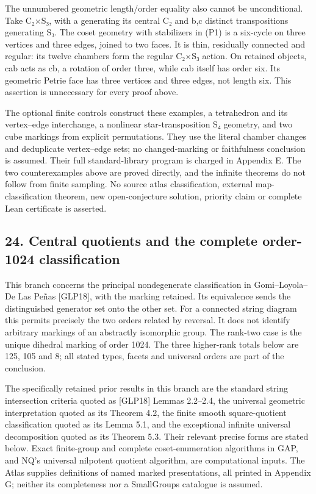 \documentclass[
  10pt,
  letterpaper,
]{article}
\begin{document}
The unnumbered geometric length/order equality also cannot be
unconditional. Take C₂×S₃, with a generating its central C₂ and b,c
distinct transpositions generating S₃. The coset geometry with
stabilizers in (P1) is a six-cycle on three vertices and three edges,
joined to two faces. It is thin, residually connected and regular: its
twelve chambers form the regular C₂×S₃ action. On retained objects, cab
acts as cb, a rotation of order three, while cab itself has order six.
Its geometric Petrie face has three vertices and three edges, not length
six. This assertion is unnecessary for every proof above.

The optional finite controls construct these examples, a tetrahedron and
its vertex--edge interchange, a nonlinear star-transposition S₄
geometry, and two cube markings from explicit permutations. They use the
literal chamber changes and deduplicate vertex--edge sets; no
changed-marking or faithfulness conclusion is assumed. Their full
standard-library program is charged in Appendix E. The two
counterexamples above are proved directly, and the infinite theorems do
not follow from finite sampling. No source atlas classification,
external map-classification theorem, new open-conjecture solution,
priority claim or complete Lean certificate is asserted.

\subsection{24. Central quotients and the complete order-1024
classification}\label{central-quotients-and-the-complete-order-1024-classification}

This branch concerns the principal nondegenerate classification in
Gomi--Loyola--De Las Peñas {[}GLP18{]}, with the marking retained. Its
equivalence sends the distinguished generator set onto the other set.
For a connected string diagram this permits precisely the two orders
related by reversal. It does not identify arbitrary markings of an
abstractly isomorphic group. The rank-two case is the unique dihedral
marking of order 1024. The three higher-rank totals below are 125, 105
and 8; all stated types, facets and universal orders are part of the
conclusion.

The specifically retained prior results in this branch are the standard
string intersection criteria quoted as {[}GLP18{]} Lemmas 2.2--2.4, the
universal geometric interpretation quoted as its Theorem 4.2, the finite
smooth square-quotient classification quoted as its Lemma 5.1, and the
exceptional infinite universal decomposition quoted as its Theorem 5.3.
Their relevant precise forms are stated below. Exact finite-group and
complete coset-enumeration algorithms in GAP, and NQ's universal
nilpotent quotient algorithm, are computational inputs. The Atlas
supplies definitions of named marked presentations, all printed in
Appendix G; neither its completeness nor a SmallGroups catalogue is
assumed.
\end{document}
